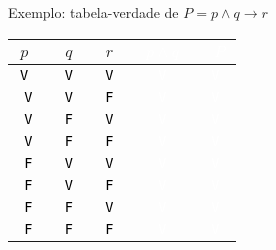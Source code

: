 \begin{frame}[fragile]{Exemplo: tabela-verdade de $P = p \land q \to r$}

    \begin{table}
        \centering
        \begin{tabular}{>{\tt}c>{\tt}c>{\tt}c>{\tt}c>{\tt}c}
            \hline
            $p$ & $q$ & $r$ & \textcolor{white}{$p\land q$} & \textcolor{white}{$P$}\\
            \hline
            \textcolor{black}{V} & \textcolor{black}{V} & \textcolor{black}{V} & \textcolor{white}{V} & \textcolor{white}{V} \\
            \hline
            \textcolor{black}{V} & \textcolor{black}{V} & \textcolor{black}{F} & \textcolor{white}{V} & \textcolor{white}{V} \\
            \hline
            \textcolor{black}{V} & \textcolor{black}{F} & \textcolor{black}{V} & \textcolor{white}{V} & \textcolor{white}{V} \\
            \hline
            \textcolor{black}{V} & \textcolor{black}{F} & \textcolor{black}{F} & \textcolor{white}{V} & \textcolor{white}{V} \\
            \hline
            \textcolor{black}{F} & \textcolor{black}{V} & \textcolor{black}{V} & \textcolor{white}{V} & \textcolor{white}{V} \\
            \hline
            \textcolor{black}{F} & \textcolor{black}{V} & \textcolor{black}{F} & \textcolor{white}{V} & \textcolor{white}{V} \\
            \hline
            \textcolor{black}{F} & \textcolor{black}{F} & \textcolor{black}{V} & \textcolor{white}{V} & \textcolor{white}{V} \\
            \hline
            \textcolor{black}{F} & \textcolor{black}{F} & \textcolor{black}{F} & \textcolor{white}{V} & \textcolor{white}{V} \\
            \hline
        \end{tabular}
    \end{table}
\end{frame}

